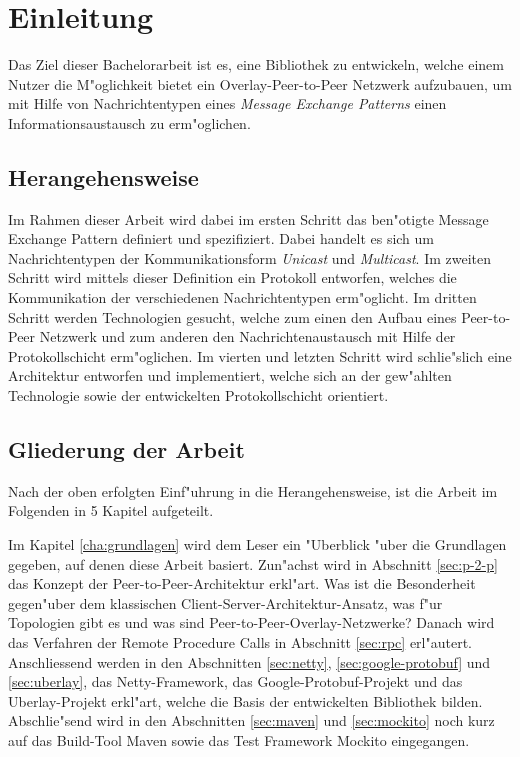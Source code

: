 \chapter{Einleitung}
\label{cha:einleitung}

Das Ziel dieser Bachelorarbeit ist es, eine Bibliothek zu entwickeln, welche einem Nutzer die M"oglichkeit bietet ein Overlay-Peer-to-Peer Netzwerk aufzubauen, um mit Hilfe von Nachrichtentypen eines \emph{Message Exchange Patterns} einen Informationsaustausch zu erm"oglichen.

\section{Herangehensweise}

Im Rahmen dieser Arbeit wird dabei im ersten Schritt das ben"otigte Message Exchange Pattern definiert und spezifiziert. Dabei handelt es sich um Nachrichtentypen der Kommunikationsform \emph{Unicast} und \emph{Multicast}. Im zweiten Schritt wird mittels dieser Definition ein Protokoll entworfen, welches die Kommunikation der verschiedenen Nachrichtentypen erm"oglicht. Im dritten Schritt werden Technologien gesucht, welche zum einen den Aufbau eines Peer-to-Peer Netzwerk und zum anderen den Nachrichtenaustausch mit Hilfe der Protokollschicht erm"oglichen. Im vierten und letzten Schritt wird schlie"slich eine Architektur entworfen und implementiert, welche sich an der gew"ahlten Technologie sowie der entwickelten Protokollschicht orientiert. 

\section{Gliederung der Arbeit}
Nach der oben erfolgten Einf"uhrung in die Herangehensweise, ist die Arbeit im Folgenden in 5 Kapitel aufgeteilt.

Im Kapitel \ref{cha:grundlagen} wird dem Leser ein "Uberblick "uber die Grundlagen gegeben, auf denen diese Arbeit basiert. Zun"achst wird in Abschnitt \ref{sec:p-2-p} das Konzept der Peer-to-Peer-Architektur erkl"art. Was ist die Besonderheit gegen"uber dem klassischen Client-Server-Architektur-Ansatz, was f"ur Topologien gibt es und was sind Peer-to-Peer-Overlay-Netzwerke? Danach wird das Verfahren der Remote Procedure Calls in Abschnitt \ref{sec:rpc} erl"autert. Anschliessend werden in den Abschnitten \ref{sec:netty}, \ref{sec:google-protobuf} und \ref{sec:uberlay}, das Netty-Framework, das Google-Protobuf-Projekt und das Uberlay-Projekt erkl"art, welche die Basis der entwickelten Bibliothek bilden. Abschlie"send wird in den Abschnitten \ref{sec:maven} und \ref{sec:mockito} noch kurz auf das Build-Tool Maven sowie das Test Framework Mockito eingegangen.

